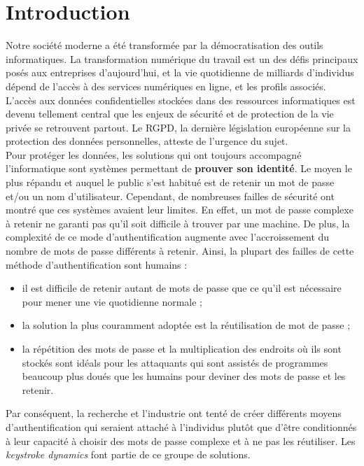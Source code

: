\section{Introduction}

Notre société moderne a été transformée par la démocratisation des outils informatiques. La transformation numérique du travail est un des défis principaux posés aux entreprises d'aujourd'hui, et la vie quotidienne de milliards d'individus dépend de l'accès à des services numériques en ligne, et les profils associés. \\

L'accès aux données confidentielles stockées dans des ressources informatiques est devenu tellement central que les enjeux de sécurité et de protection de la vie privée se retrouvent partout. Le RGPD, la dernière législation européenne sur la protection des données personnelles, atteste de l'urgence du sujet. \\

Pour protéger les données, les solutions qui ont toujours accompagné l'informatique sont systèmes permettant de \textbf{prouver son identité}. Le moyen le plus répandu et auquel le public s'est habitué est de retenir un mot de passe et/ou un nom d'utilisateur. Cependant, de nombreuses failles de sécurité ont montré que ces systèmes avaient leur limites. En effet, un mot de passe complexe à retenir ne garanti pas qu'il soit difficile à trouver par une machine. De plus, la complexité de ce mode d'authentification augmente avec l'accroissement du nombre de mots de passe différents à retenir. Ainsi, la plupart des failles de cette méthode d'authentification sont humains :\\

\begin{itemize}
	\item il est difficile de retenir autant de mots de passe que ce qu'il est nécessaire pour mener une vie quotidienne normale ;
	\item la solution la plus couramment adoptée est la réutilisation de mot de passe ;
	\item la répétition des mots de passe et la multiplication des endroits où ils sont stockés sont idéals pour les attaquants qui sont assistés de programmes beaucoup plus doués que les humains pour deviner des mots de passe et les retenir.\\
\end{itemize}

Par conséquent, la recherche et l'industrie ont tenté de créer différents moyens d'authentification qui seraient attaché à l'individus plutôt que d'être conditionnés à leur capacité à choisir des mots de passe complexe et à ne pas les réutiliser. Les \textit{keystroke dynamics} font partie de ce groupe de solutions. \\

